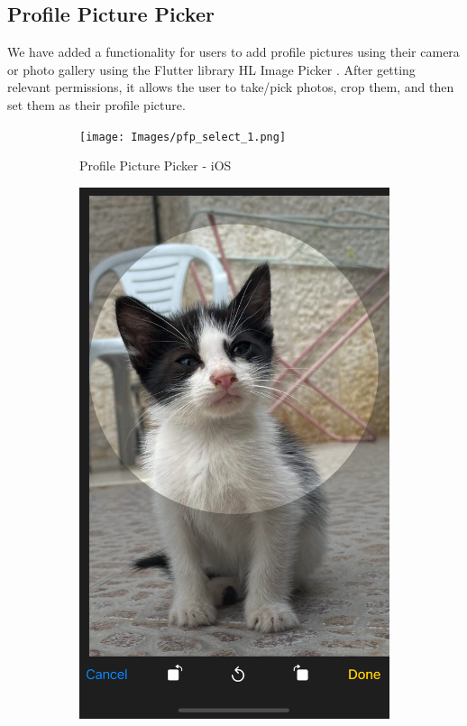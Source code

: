 \documentclass[a4paper, 12pt]{report} %
\begin{document}
        \pagebreak
        \subsection{Profile Picture Picker}
            We have added a functionality for users to add profile pictures using their camera or photo gallery using the Flutter library HL Image Picker \cite{image_picker_lib}. After getting relevant permissions, it allows the user to take/pick photos, crop them, and then set them as their profile picture. 
            \begin{figure}[H]
                \centering
                \begin{subfigure}{0.4\textwidth}
                    \texttt{[image: Images/pfp\_select\_1.png]}
                    \caption{Profile Picture Picker - iOS}
                    \label{fig:pfp_select_1}
                \end{subfigure}
                \begin{subfigure}{0.4\textwidth}
                    \includegraphics[width=\linewidth]{Images/pfp_select_2.png}

\end{subfigure}
\end{figure}
\end{document}
